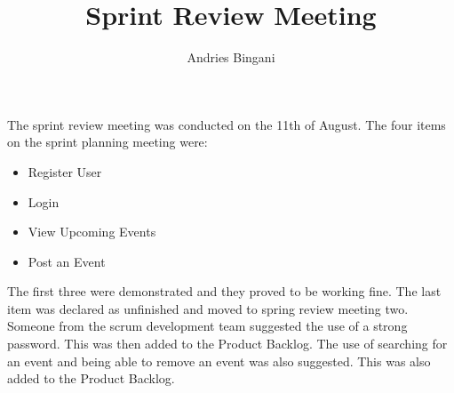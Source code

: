 \documentclass[10pt,a4paper]{article}
\author{Andries Bingani}
\title{Sprint Review Meeting}
\begin{document}
\maketitle

The sprint review meeting was conducted on the 11th of August. The four items on the sprint planning meeting were: \\
\begin{itemize}
\item Register User
\item Login
\item View Upcoming Events
\item Post an Event
\end{itemize}

The first three were demonstrated and they proved to be working fine. The last item was declared as unfinished and moved to spring review meeting two.
\\
Someone from the scrum development team suggested the use of a strong password. This was then added to the Product Backlog. The use of searching for an event and being able to remove an event was also suggested. This was also added to the Product Backlog. 
\end{document}
